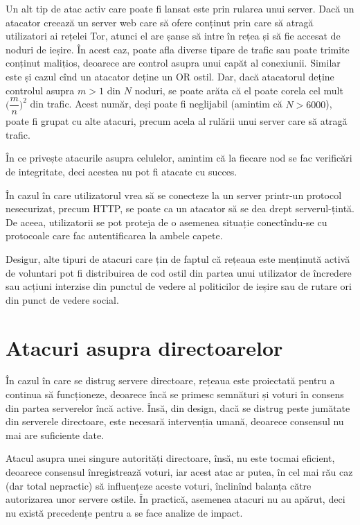 Un alt tip de atac activ care poate fi lansat este prin rularea unui server.
Dacă un atacator creează un server web care să ofere conținut prin care
să atragă utilizatori ai rețelei Tor, atunci el are șanse să intre în rețea
și să fie accesat de noduri de ieșire. În acest caz, poate afla diverse
tipare de trafic sau poate trimite conținut malițios, deoarece are control
asupra unui capăt al conexiunii. Similar este și cazul cînd un atacator
deține un OR ostil. Dar, dacă atacatorul deține controlul asupra $ m > 1 $
din $ N $ noduri, se poate arăta că el poate corela cel mult $ \Big(\dfrac{m}{n}\Big)^2 $
din trafic. Acest număr, deși poate fi neglijabil (amintim că $ N > 6000 $),
poate fi grupat cu alte atacuri, precum acela al rulării unui server care
să atragă trafic.

În ce privește atacurile asupra celulelor, amintim că la fiecare nod se
fac verificări de integritate, deci acestea nu pot fi atacate cu succes.

În cazul în care utilizatorul vrea să se conecteze la un server printr-un
protocol nesecurizat, precum HTTP, se poate ca un atacator să se dea drept
serverul-țintă. De aceea, utilizatorii se pot proteja de o asemenea situație
conectîndu-se cu protocoale care fac autentificarea la ambele capete.

Desigur, alte tipuri de atacuri care țin de faptul că rețeaua este menținută
activă de voluntari pot fi distribuirea de cod ostil din partea unui utilizator
de încredere sau acțiuni interzise din punctul de vedere al politicilor
de ieșire sau de rutare ori din punct de vedere social.


\section{Atacuri asupra directoarelor}

\indent\indent În cazul în care se distrug servere directoare, rețeaua
este proiectată pentru a continua să funcționeze, deoarece încă se
primesc semnături și voturi în consens din partea serverelor încă
active. Însă, din design, dacă se distrug peste jumătate din serverele
directoare, este necesară intervenția umană, deoarece consensul nu mai
are suficiente date.

Atacul asupra unei singure autorități directoare, însă, nu este tocmai
eficient, deoarece consensul înregistrează voturi, iar acest atac ar
putea, în cel mai rău caz (dar total nepractic) să influențeze aceste
voturi, înclinînd balanța către autorizarea unor servere ostile.
În practică, asemenea atacuri nu au apărut, deci nu există precedențe
pentru a se face analize de impact.

